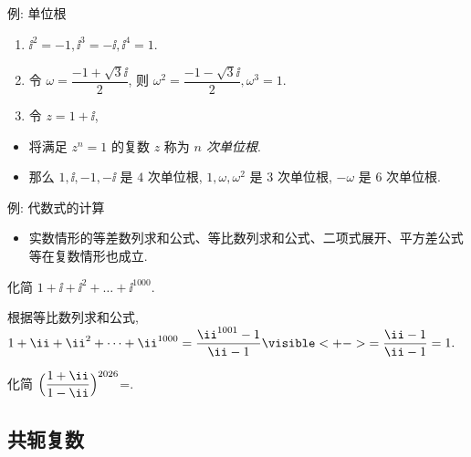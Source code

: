 \begin{frame}{例: 单位根}
	\onslide<+->
	\begin{example}
		\begin{enumerate}
			\item $\ii^2=-1,\ii^3=-\ii ,\ii^4=1$.
			\onslide<+->{%
			一般地, 对于整数 $n$, 
			\[
				\ii^{4n}=1,\quad \ii^{4n+1}=i,\quad
				\ii^{4n+2}=-1,\quad \ii^{4n+3}=-\ii.
			\]
			}
			\vspace{-\baselineskip}
			\item 令 $\omega=\dfrac{-1+\sqrt 3\ii}2$, 则 $\omega^2=\dfrac{-1-\sqrt3\ii}2,\omega^3=1$.
			\item 令 $z=1+\ii$, \onslide<+->{则
			\[
				z^2=2\ii,\quad z^3=-2+2\ii,\quad z^4=-4,\quad z^8=16=2^4.
			\]}
		\end{enumerate}
		\bigdel\bigdel
	\end{example}
	\begin{itemize}
		\item 将满足 $z^n=1$ 的复数 $z$ 称为 \emph{$n$ 次单位根}.
		\item 那么 $1,\ii,-1,-\ii $ 是 $4$ 次单位根, $1,\omega,\omega^2$ 是 $3$ 次单位根, $-\omega$ 是 $6$ 次单位根.
	\end{itemize}
\end{frame}


\begin{frame}{例: 代数式的计算}
	\begin{itemize}
		\item 实数情形的等差数列求和公式、等比数列求和公式、二项式展开、平方差公式等在复数情形也成立.
	\end{itemize}
	\onslide<+->
	\begin{example}[nearnext]
		化简 $1+\ii+\ii^2+\dots+\ii^{1000}$.
	\end{example}
	\onslide<+->
	\begin{solution}[nearprev]
		根据等比数列求和公式, $1+\ii+\ii^2+\dots+\ii^{1000}
			=\dfrac{\ii^{1001}-1}{\ii-1}
			\visible<+->{=\dfrac{\ii-1}{\ii-1}=1.}$
	\end{solution}
	\onslide<+->
	\begin{exercise}
		化简 $\Bigl(\dfrac{1+\ii}{1-\ii}\Bigr)^{2026}$=.
	\end{exercise}
\end{frame}


\subsection{共轭复数}


